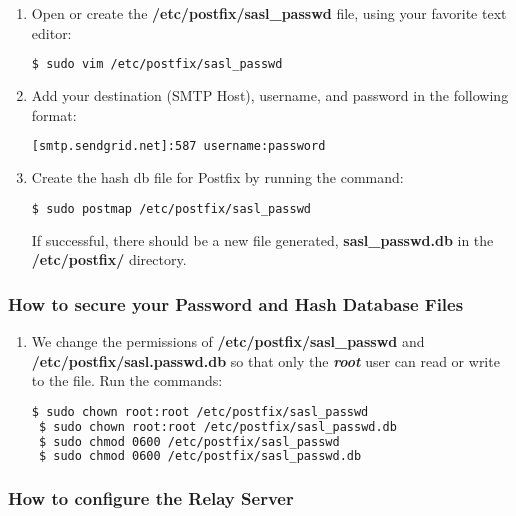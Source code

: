 \begin{enumerate}
\item { Open or create the \textbf{/etc/postfix/sasl\_passwd} file,
		using your favorite text editor: 
  \begin{lstlisting}[language=bash]
 $ sudo vim /etc/postfix/sasl_passwd
   \end{lstlisting}
 }
 \item { Add your destination (SMTP Host), username, and password in the
	 following format: 
  \begin{lstlisting}[language=bash]
 [smtp.sendgrid.net]:587 username:password 
   \end{lstlisting}
 }
 \item { Create the hash db file for Postfix by running the command:
   \begin{lstlisting}[language=bash]
 $ sudo postmap /etc/postfix/sasl_passwd 
   \end{lstlisting}
If successful, there should be a new file generated, \textbf{sasl\_passwd.db}
		in the \textbf{/etc/postfix/} directory.
 }
\end{enumerate}

\subsubsection{How to secure your Password and Hash Database Files}

\begin{enumerate}
 \item { We change the permissions of \textbf{/etc/postfix/sasl\_passwd}
		and \textbf{/etc/postfix/sasl.passwd.db} so that only the
		\textbf\textit{root} user can read or write to the file. Run
		the commands:
  \begin{lstlisting}[language=bash]
 $ sudo chown root:root /etc/postfix/sasl_passwd 
 $ sudo chown root:root /etc/postfix/sasl_passwd.db
 $ sudo chmod 0600 /etc/postfix/sasl_passwd
 $ sudo chmod 0600 /etc/postfix/sasl_passwd.db
   \end{lstlisting}
 }
\end{enumerate}

\subsubsection{How to configure the Relay Server}

